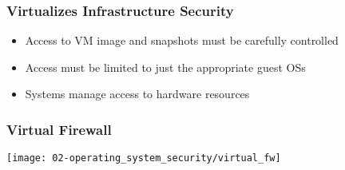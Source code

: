 \subsubsection{Virtualizes Infrastructure Security}
\begin{itemize}
    \item Access to VM image and snapshots must be carefully controlled
    \item Access must be limited to just the appropriate guest OSs
    \item Systems manage access to hardware resources
\end{itemize}

\subsubsection{Virtual Firewall}
\begin{center}
    \texttt{[image: 02-operating\_system\_security/virtual\_fw]}
    \vspace{-8pt}
\end{center}


